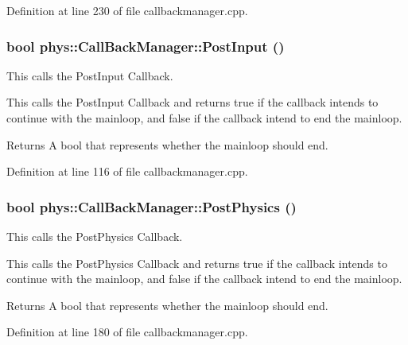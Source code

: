 Definition at line 230 of file callbackmanager.cpp.

\hypertarget{classphys_1_1CallBackManager_a83afb36cfc7e71863d68a8b4c1d5e9d2}{
\subsubsection[{PostInput}]{\setlength{\rightskip}{0pt plus 5cm}bool phys::CallBackManager::PostInput ()}}
\label{d1/d47/classphys_1_1CallBackManager_a83afb36cfc7e71863d68a8b4c1d5e9d2}


This calls the PostInput Callback. 

This calls the PostInput Callback and returns true if the callback intends to continue with the mainloop, and false if the callback intend to end the mainloop. \begin{DoxyReturn}{Returns}
A bool that represents whether the mainloop should end. 
\end{DoxyReturn}


Definition at line 116 of file callbackmanager.cpp.

\hypertarget{classphys_1_1CallBackManager_a06bf0e8787f21caf31bf428727155084}{
\subsubsection[{PostPhysics}]{\setlength{\rightskip}{0pt plus 5cm}bool phys::CallBackManager::PostPhysics ()}}
\label{d1/d47/classphys_1_1CallBackManager_a06bf0e8787f21caf31bf428727155084}


This calls the PostPhysics Callback. 

This calls the PostPhysics Callback and returns true if the callback intends to continue with the mainloop, and false if the callback intend to end the mainloop. \begin{DoxyReturn}{Returns}
A bool that represents whether the mainloop should end. 
\end{DoxyReturn}


Definition at line 180 of file callbackmanager.cpp.

